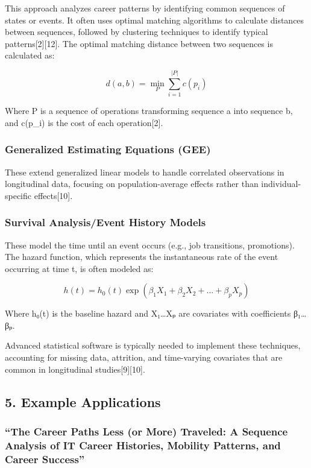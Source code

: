 \documentclass[
  letterpaper,
  DIV=11,
  numbers=noendperiod]{scrartcl}
\begin{document}
This approach analyzes career patterns by identifying common sequences
of states or events. It often uses optimal matching algorithms to
calculate distances between sequences, followed by clustering techniques
to identify typical patterns{[}2{]}{[}12{]}. The optimal matching
distance between two sequences is calculated as:

\[ d(a,b) = \min_P \sum_{i=1}^{|P|} c(p_i) \]

Where P is a sequence of operations transforming sequence a into
sequence b, and c(p\_i) is the cost of each operation{[}2{]}.

\subsubsection{Generalized Estimating Equations
(GEE)}\label{generalized-estimating-equations-gee}

These extend generalized linear models to handle correlated observations
in longitudinal data, focusing on population-average effects rather than
individual-specific effects{[}10{]}.

\subsubsection{Survival Analysis/Event History
Models}\label{survival-analysisevent-history-models}

These model the time until an event occurs (e.g., job transitions,
promotions). The hazard function, which represents the instantaneous
rate of the event occurring at time t, is often modeled as:

\[ h(t) = h_0(t) \exp(\beta_1 X_1 + \beta_2 X_2 + ... + \beta_p X_p) \]

Where h₀(t) is the baseline hazard and X₁\ldots Xₚ are covariates with
coefficients β₁\ldots βₚ.

Advanced statistical software is typically needed to implement these
techniques, accounting for missing data, attrition, and time-varying
covariates that are common in longitudinal studies{[}9{]}{[}10{]}.

\subsection{5. Example Applications}\label{example-applications}

\subsubsection{``The Career Paths Less (or More) Traveled: A Sequence
Analysis of IT Career Histories, Mobility Patterns, and Career
Success''}\label{the-career-paths-less-or-more-traveled-a-sequence-analysis-of-it-career-histories-mobility-patterns-and-career-success}
\end{document}
